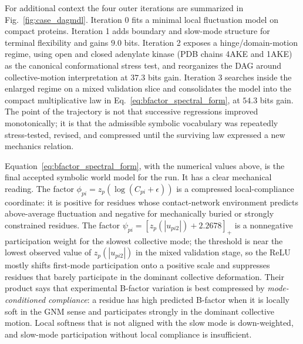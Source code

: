 \documentclass[11pt]{article}
\theoremstyle{definition}
\begin{document}
For additional context the four outer iterations are summarized in Fig.~\ref{fig:case_dagmdl}. Iteration 0 fits a minimal local fluctuation model on compact proteins. Iteration 1 adds boundary and slow-mode structure for terminal flexibility and gains $9.0$ bits. Iteration 2 exposes a hinge/domain-motion regime, using open and closed adenylate kinase (PDB chains 4AKE and 1AKE) as the canonical conformational stress test, and reorganizes the DAG around collective-motion interpretation at $37.3$ bits gain. Iteration 3 searches inside the enlarged regime on a mixed validation slice and consolidates the model into the compact multiplicative law in Eq.~\ref{eq:bfactor_spectral_form}, at $54.3$ bits gain. The point of the trajectory is not that successive regressions improved monotonically; it is that the admissible symbolic vocabulary was repeatedly stress-tested, revised, and compressed until the surviving law expressed a new mechanics relation.

Equation~\ref{eq:bfactor_spectral_form}, with the numerical values above, is the final accepted symbolic world model for the run. It has a clear mechanical reading. The factor $\phi_{pi}=z_p(\log(C_{pi}+\epsilon))$ is a compressed local-compliance coordinate: it is positive for residues whose contact-network environment predicts above-average fluctuation and negative for mechanically buried or strongly constrained residues. The factor $\psi_{pi}=[z_p(|u_{pi2}|)+2.2678]_+$ is a nonnegative participation weight for the slowest collective mode; the threshold is near the lowest observed value of $z_p(|u_{pi2}|)$ in the mixed validation stage, so the ReLU mostly shifts first-mode participation onto a positive scale and suppresses residues that barely participate in the dominant collective deformation. Their product says that experimental B-factor variation is best compressed by \emph{mode-conditioned compliance}: a residue has high predicted B-factor when it is locally soft in the GNM sense and participates strongly in the dominant collective motion. Local softness that is not aligned with the slow mode is down-weighted, and slow-mode participation without local compliance is insufficient.
\end{document}
